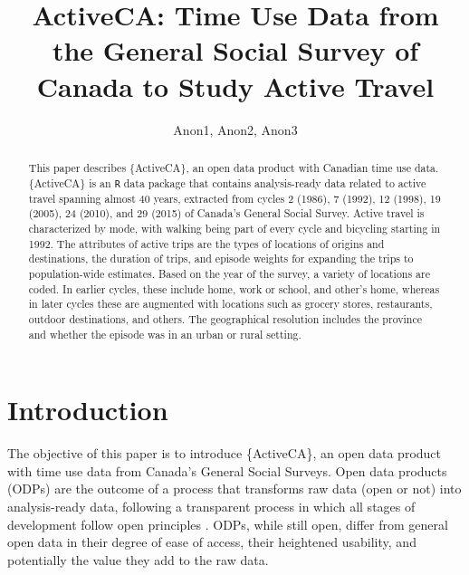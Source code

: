 \documentclass[Royal,times,sageh]{sagej}
\begin{document}

\title{ActiveCA: Time Use Data from the General Social Survey of Canada
to Study Active Travel}

\runninghead{}

\author{Anon1\affilnum{}, Anon2\affilnum{}, Anon3\affilnum{}}

\affiliation{\affilnum{}{}}



\begin{abstract}
This paper describes \{ActiveCA\}, an open data product with Canadian
time use data. \{ActiveCA\} is an \texttt{R} data package that contains
analysis-ready data related to active travel spanning almost 40 years,
extracted from cycles 2 (1986), 7 (1992), 12 (1998), 19 (2005), 24
(2010), and 29 (2015) of Canada's General Social Survey. Active travel
is characterized by mode, with walking being part of every cycle and
bicycling starting in 1992. The attributes of active trips are the types
of locations of origins and destinations, the duration of trips, and
episode weights for expanding the trips to population-wide estimates.
Based on the year of the survey, a variety of locations are coded. In
earlier cycles, these include home, work or school, and other's home,
whereas in later cycles these are augmented with locations such as
grocery stores, restaurants, outdoor destinations, and others. The
geographical resolution includes the province and whether the episode
was in an urban or rural setting.
\end{abstract}


\maketitle

\hypertarget{introduction}{%
\section{Introduction}\label{introduction}}

The objective of this paper is to introduce \{ActiveCA\}, an open data
product with time use data from Canada's General Social Surveys. Open
data products (ODPs) are the outcome of a process that transforms raw
data (open or not) into analysis-ready data, following a transparent
process in which all stages of development follow open principles
\citep{arribas-bel2021}. ODPs, while still open, differ from general
open data in their degree of ease of access, their heightened usability,
and potentially the value they add to the raw data.
\end{document}
